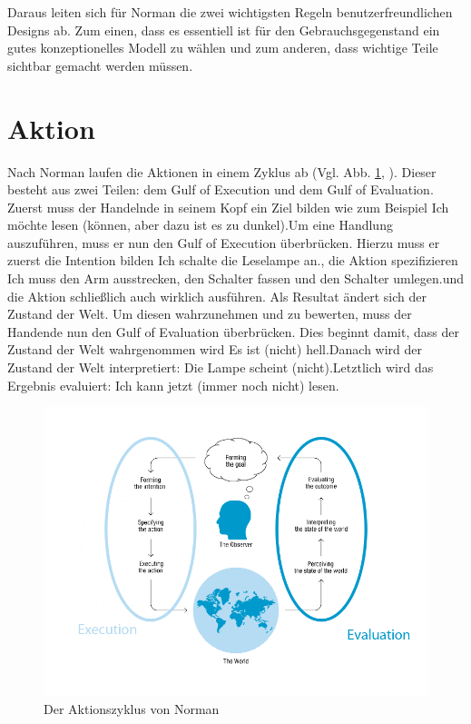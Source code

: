 \documentclass[parskip,headsepline, headtopline, %
footsepline, oneside, 12pt, headings=small]{scrreprt}
\begin{document}
Daraus leiten sich für Norman die  zwei wichtigsten Regeln benutzerfreundlichen Designs ab. Zum einen, dass es essentiell ist für den Gebrauchsgegenstand ein gutes konzeptionelles Modell zu wählen und zum anderen, dass wichtige Teile sichtbar gemacht werden müssen.

\section{Aktion}

Nach Norman laufen die Aktionen in einem Zyklus ab (Vgl. Abb. \ref{fig:action}, \cite[S. 46ff]{don}). Dieser besteht aus zwei Teilen: dem Gulf of Execution und dem Gulf of Evaluation. Zuerst muss der Handelnde in seinem Kopf ein Ziel bilden wie zum Beispiel \glqq Ich möchte lesen (können, aber dazu ist es zu dunkel).\grqq Um eine Handlung auszuführen, muss er nun den Gulf of Execution überbrücken. Hierzu muss er zuerst die Intention bilden \glqq Ich schalte die Leselampe an.\grqq, die Aktion spezifizieren \glqq Ich muss den Arm ausstrecken, den Schalter fassen und den Schalter umlegen.\grqq und die Aktion schließlich auch wirklich ausführen. Als Resultat ändert sich der Zustand der Welt. Um diesen wahrzunehmen und zu bewerten, muss der Handende nun den Gulf of Evaluation überbrücken. Dies beginnt damit, dass der Zustand der Welt wahrgenommen wird \glqq Es ist (nicht) hell.\grqq Danach wird der Zustand der Welt interpretiert: \glqq Die Lampe scheint (nicht).\grqq Letztlich wird das Ergebnis evaluiert: \glqq Ich kann jetzt (immer noch nicht) lesen.\grqq

\begin{figure}
\includegraphics[width=\textwidth]{images/ActionCycle.png}
\caption{Der Aktionszyklus von Norman}
\label{fig:action}
\end{figure}
\end{document}
